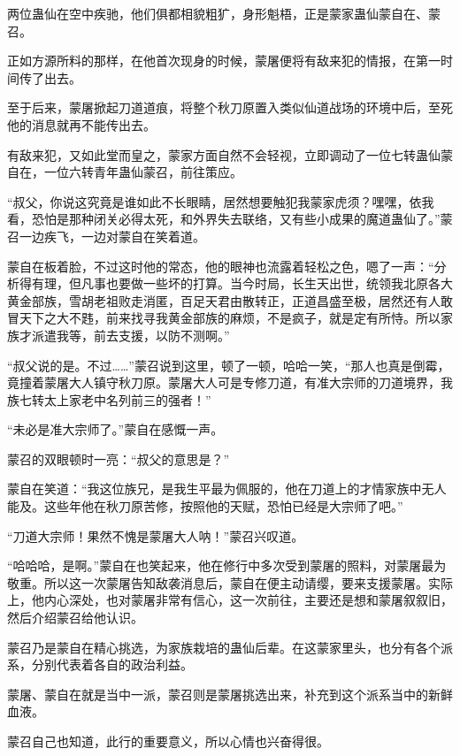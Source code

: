 
\begin{this_body}

两位蛊仙在空中疾驰，他们俱都相貌粗犷，身形魁梧，正是蒙家蛊仙蒙自在、蒙召。

正如方源所料的那样，在他首次现身的时候，蒙屠便将有敌来犯的情报，在第一时间传了出去。

至于后来，蒙屠掀起刀道道痕，将整个秋刀原置入类似仙道战场的环境中后，至死他的消息就再不能传出去。

有敌来犯，又如此堂而皇之，蒙家方面自然不会轻视，立即调动了一位七转蛊仙蒙自在，一位六转青年蛊仙蒙召，前往策应。

“叔父，你说这究竟是谁如此不长眼睛，居然想要触犯我蒙家虎须？嘿嘿，依我看，恐怕是那种闭关必得太死，和外界失去联络，又有些小成果的魔道蛊仙了。”蒙召一边疾飞，一边对蒙自在笑着道。

蒙自在板着脸，不过这时他的常态，他的眼神也流露着轻松之色，嗯了一声：“分析得有理，但凡事也要做一些坏的打算。当今时局，长生天出世，统领我北原各大黄金部族，雪胡老祖败走消匿，百足天君由散转正，正道昌盛至极，居然还有人敢冒天下之大不韪，前来找寻我黄金部族的麻烦，不是疯子，就是定有所恃。所以家族才派遣我等，前去支援，以防不测啊。”

“叔父说的是。不过……”蒙召说到这里，顿了一顿，哈哈一笑，“那人也真是倒霉，竟撞着蒙屠大人镇守秋刀原。蒙屠大人可是专修刀道，有准大宗师的刀道境界，我族七转太上家老中名列前三的强者！”

“未必是准大宗师了。”蒙自在感慨一声。

蒙召的双眼顿时一亮：“叔父的意思是？”

蒙自在笑道：“我这位族兄，是我生平最为佩服的，他在刀道上的才情家族中无人能及。这些年他在秋刀原苦修，按照他的天赋，恐怕已经是大宗师了吧。”

“刀道大宗师！果然不愧是蒙屠大人呐！”蒙召兴叹道。

“哈哈哈，是啊。”蒙自在也笑起来，他在修行中多次受到蒙屠的照料，对蒙屠最为敬重。所以这一次蒙屠告知敌袭消息后，蒙自在便主动请缨，要来支援蒙屠。实际上，他内心深处，也对蒙屠非常有信心，这一次前往，主要还是想和蒙屠叙叙旧，然后介绍蒙召给他认识。

蒙召乃是蒙自在精心挑选，为家族栽培的蛊仙后辈。在这蒙家里头，也分有各个派系，分别代表着各自的政治利益。

蒙屠、蒙自在就是当中一派，蒙召则是蒙屠挑选出来，补充到这个派系当中的新鲜血液。

蒙召自己也知道，此行的重要意义，所以心情也兴奋得很。


\end{this_body}
